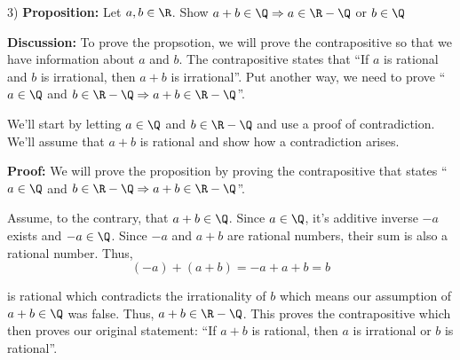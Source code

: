    \begin{paragraph}{3)}
        \textbf{Proposition:} Let $a, b \in \R$. Show $a + b \in \Q \Rightarrow a \in \R - \Q$ or $b \in \Q$
        \spacing

        \textbf{Discussion:} To prove the propsotion, we will prove the contrapositive so that 
        we have information about $a$ and $b$. The contrapositive states that ``If $a$ is rational 
        and $b$ is irrational, then $a + b$ is irrational''. Put another way, we need to 
        prove ``$a \in \Q$ and $b \in \R - \Q \Rightarrow a + b \in \R - \Q$''.
        
        We'll start by letting $a \in \Q$ and $b \in \R - \Q$ and use a proof of contradiction.
        We'll assume that $a + b$ is rational and show how a contradiction arises.
        \spacing

        \textbf{Proof:} We will prove the proposition by proving the contrapositive that states
        ``$a \in \Q$ and $b \in \R - \Q \Rightarrow a + b \in \R - \Q$''. 
        \spacing

        Assume, to the contrary, that $a + b \in \Q$. Since $a \in \Q$, it's additive 
        inverse $-a$ exists and $-a \in \Q$. Since $-a$ and $a + b$ are rational numbers, 
        their sum is also a rational number. Thus,
        $$(-a) + (a + b) = -a + a + b = b$$

        is rational which contradicts the irrationality of $b$ which means our assumption of $a + b \in \Q$ was false. Thus,
        $a + b \in \R - \Q$. This proves the contrapositive which then proves our original statement:
        ``If $a + b$ is rational, then $a$ is irrational or $b$ is rational''.

        \proofEnd
    \end{paragraph}
